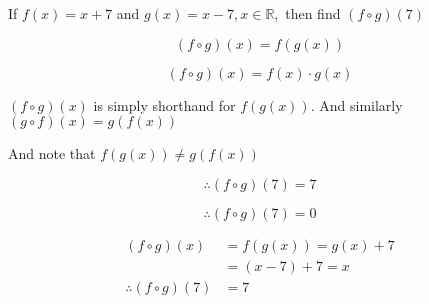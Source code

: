 \documentclass[14pt,fleqn]{extarticle}
\begin{document}
\begin{problem}
\statement
	
If $f(x) = x + 7$ and $g(x) = x-7, x\in\mathbb{R},$ 
then find $(f\circ g)(7)$
%
\begin{step}
	\begin{options}
		\correct

		\[(f\circ g)(x) = f\left( g\left( x\right)\right) \]

		\incorrect

		\[(f\circ g)(x) = f(x)\cdot g(x) \]

	\end{options}
	\reason

$(f\circ g)(x)$ is simply shorthand for $ f\left( g\left( x\right)\right)$.
And similarly $\left(g\circ f \right)(x) = g \left( f \left(x \right) \right)$\newline 

And note that $ f \left(g(x) \right)\neq g \left(f(x) \right)$
\end{step}
\begin{step}
	\begin{options}
		\correct

		\[\therefore (f\circ g)(7) = 7 \]

		\incorrect

		\[\therefore (f\circ g)(7) = 0\]

	\end{options}
	\reason

	\begin{align}
(f\circ g)(x) &= f\left( g\left( x \right) \right) = g(x) + 7 \\
&= (x-7) + 7 = x \\ 
\therefore (f\circ g)(7) &= 7
\end{align} 
\end{step}
\end{problem}
\end{document}
